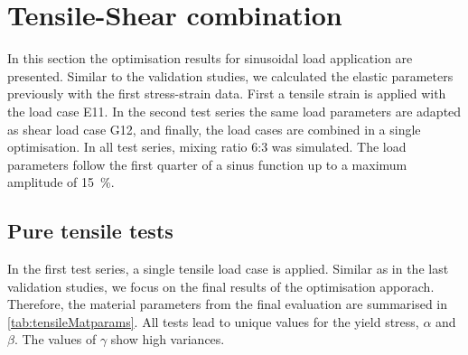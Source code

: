 


\section{Tensile-Shear combination}
In this section the optimisation results for sinusoidal load application are presented. Similar to the validation studies, we calculated the elastic parameters previously with the first stress-strain data. First a tensile strain is applied with the load case E11. In the second test series the same load parameters are adapted as shear load case G12, and finally, the load cases are combined in a single optimisation. In all test series, mixing ratio 6:3 was simulated. The load parameters follow the first quarter of a sinus function up to a maximum amplitude of 15 \%. 

\subsection{Pure tensile tests}
In the first test series, a single tensile load case is applied. Similar as in the last validation studies, we focus on the final results of the optimisation apporach. Therefore, the material parameters from the final evaluation are summarised in \autoref{tab:tensileMatparams}. All tests lead to unique values for the yield stress, $\alpha$ and $\beta$. The values of $\gamma$ show high variances. 

